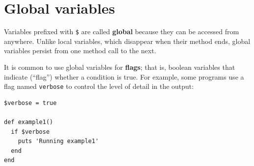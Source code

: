 \documentclass[10pt]{book}
\begin{document}
\section{Global variables}

Variables prefixed with {\tt \$} are called {\bf global}
because they can be accessed from anywhere.  Unlike local
variables, which disappear when their method ends, global variables
persist from one method call to the next.

It is common to use global variables for {\bf flags}; that is, 
boolean variables that indicate (``flag'') whether a condition
is true.  For example, some programs use
a flag named {\tt verbose} to control the level of detail in the
output:

\begin{verbatim}
$verbose = true

def example1()
  if $verbose
    puts 'Running example1'
  end
end
\end{verbatim}
%
\end{document}

